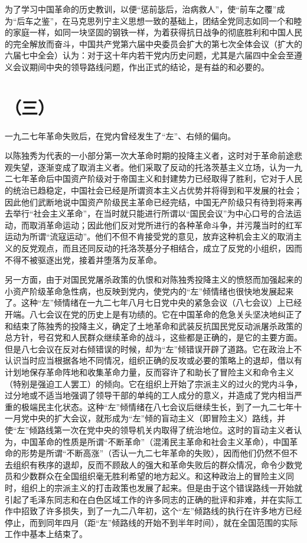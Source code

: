为了学习中国革命的历史教训，以便“惩前毖后，治病救人”，使“前车之覆”成为“后车之鉴”，在马克思列宁主义思想一致的基础上，团结全党同志如同一个和睦的家庭一样，如同一块坚固的钢铁一样，为着获得抗日战争的彻底胜利和中国人民的完全解放而奋斗，中国共产党第六届中央委员会扩大的第七次全体会议（扩大的六届七中全会）认为：对于这十年内若干党内历史问题，尤其是六届四中全会至遵义会议期间中央的领导路线问题，作出正式的结论，是有益的和必要的。

\section*{（三）}

一九二七年革命失败后，在党内曾经发生了“左”、右倾的偏向。

以陈独秀为代表的一小部分第一次大革命时期的投降主义者，这时对于革命前途悲观失望，逐渐变成了取消主义者。他们采取了反动的托洛茨基主义立场，认为一九二七年革命后中国资产阶级对于帝国主义和封建势力已经取得了胜利，它对于人民的统治已趋稳定，中国社会已经是所谓资本主义占优势并将得到和平发展的社会；因此他们武断地说中国资产阶级民主革命已经完结，中国无产阶级只有待到将来再去举行“社会主义革命”，在当时就只能进行所谓以“国民会议”为中心口号的合法运动，而取消革命运动；因此他们反对党所进行的各种革命斗争，并污蔑当时的红军运动为所谓“流寇运动”。他们不但不肯接受党的意见，放弃这种机会主义的取消主义的反党观点，而且还同反动的托洛茨基分子相结合，成立了反党的小组织，因而不得不被驱逐出党，接着并堕落为反革命。

另一方面，由于对国民党屠杀政策的仇恨和对陈独秀投降主义的愤怒而加强起来的小资产阶级革命急性病，也反映到党内，使党内的“左”倾情绪也很快地发展起来了。这种“左”倾情绪在一九二七年八月七日党中央的紧急会议（八七会议）上已经开端。八七会议在党的历史上是有功绩的。它在中国革命的危急关头坚决地纠正了和结束了陈独秀的投降主义，确定了土地革命和武装反抗国民党反动派屠杀政策的总方针，号召党和人民群众继续革命的战斗，这些都是正确的，是它的主要方面。但是八七会议在反对右倾错误的时候，却为“左”倾错误开辟了道路。它在政治上不认识当时应当根据各地不同情况，组织正确的反攻或必要的策略上的退却，借以有计划地保存革命阵地和收集革命力量，反而容许了和助长了冒险主义和命令主义（特别是强迫工人罢工）的倾向。它在组织上开始了宗派主义的过火的党内斗争，过分地或不适当地强调了领导干部的单纯的工人成分的意义，并造成了党内相当严重的极端民主化状态。这种“左”倾情绪在八七会议后继续生长，到了一九二七年十一月党中央的扩大会议，就形成为“左”倾的盲动主义（即冒险主义）路线，并使“左”倾路线第一次在党中央的领导机关内取得了统治地位。这时的盲动主义者认为，中国革命的性质是所谓“不断革命”（混淆民主革命和社会主义革命），中国革命的形势是所谓“不断高涨”（否认一九二七年革命的失败），因而他们仍然不但不去组织有秩序的退却，反而不顾敌人的强大和革命失败后的群众情况，命令少数党员和少数群众在全国组织毫无胜利希望的地方起义。和这种政治上的冒险主义同时，组织上的宗派主义的打击政策也发展了起来。但是由于这个错误路线一开始就引起了毛泽东同志和在白色区域工作的许多同志的正确的批评和非难，并在实际工作中招致了许多损失，到了一九二八年初，这个“左”倾路线的执行在许多地方已经停止，而到同年四月（距“左”倾路线的开始不到半年时间），就在全国范围的实际工作中基本上结束了。

